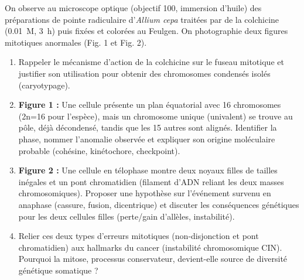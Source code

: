 \documentclass[11pt]{article}
\begin{document}
\begin{exercice}
On observe au microscope optique (objectif \num{100}\times, immersion d'huile) des préparations de pointe radiculaire d'\textit{Allium cepa} traitées par de la colchicine (\SI{0,01}{M}, \SI{3}{\hour}) puis fixées et colorées au Feulgen. On photographie deux figures mitotiques anormales (Fig. 1 et Fig. 2).
\begin{enumerate}
    \item Rappeler le mécanisme d'action de la colchicine sur le fuseau mitotique et justifier son utilisation pour obtenir des chromosomes condensés isolés (caryotypage).
    \item \textbf{Figure 1 :} Une cellule présente un plan équatorial avec 16 chromosomes (2n=16 pour l'espèce), mais un chromosome unique (univalent) se trouve au pôle, déjà décondensé, tandis que les 15 autres sont alignés. Identifier la phase, nommer l'anomalie observée et expliquer son origine moléculaire probable (cohésine, kinétochore, checkpoint).
    \item \textbf{Figure 2 :} Une cellule en télophase montre deux noyaux filles de tailles inégales et un pont chromatidien (filament d'ADN reliant les deux masses chromosomiques). Proposer une hypothèse sur l'événement survenu en anaphase (cassure, fusion, dicentrique) et discuter les conséquences génétiques pour les deux cellules filles (perte/gain d'allèles, instabilité).
    \item Relier ces deux types d'erreurs mitotiques (non-disjonction et pont chromatidien) aux hallmarks du cancer (instabilité chromosomique CIN). Pourquoi la mitose, processus conservateur, devient-elle source de diversité génétique somatique ?
\end{enumerate}
\end{exercice}
\end{document}
